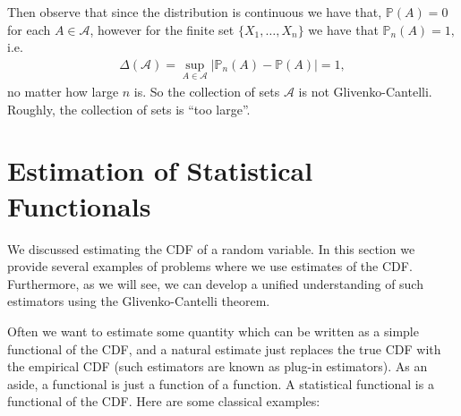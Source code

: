 \documentclass[twoside,12pt]{article}
\begin{document}
Then observe that since the distribution is continuous we have that, $\mathbb{P}(A) = 0$ for each $A \in \mathcal{A}$, however for the finite set $\{X_1,\ldots,X_n\}$ we have that $\mathbb{P}_n(A) = 1,$ i.e.
\begin{align*}
\Delta(\mathcal{A}) = \sup_{A \in \mathcal{A}} |\mathbb{P}_n(A) - \mathbb{P}(A)| = 1,
\end{align*}
no matter how large $n$ is. So the collection of sets $\mathcal{A}$ is not Glivenko-Cantelli. Roughly, the collection of sets is ``too large''.


\section{Estimation of Statistical Functionals}
We discussed estimating the CDF of a random variable. In this section we provide several examples of problems where we use estimates of the CDF. Furthermore, as we will see, we can develop a unified understanding of such estimators using the Glivenko-Cantelli theorem.

Often we want to estimate some quantity which can be written as a simple functional of the CDF, and a natural estimate just replaces the true CDF with the empirical CDF (such estimators are known as plug-in estimators). As an aside, a functional is just a function of a function. A statistical functional is a functional of the CDF. Here are some classical examples:
\end{document}

